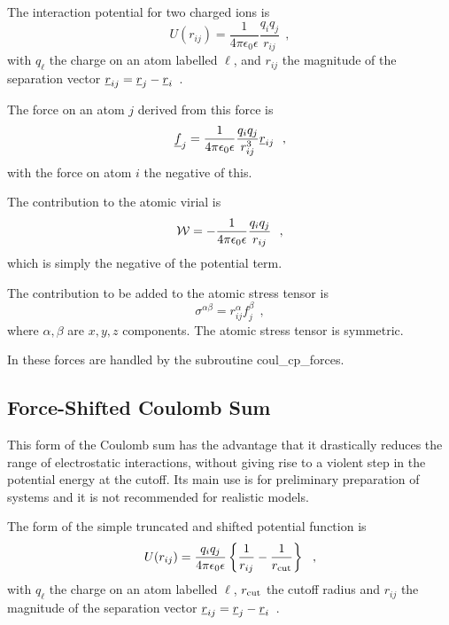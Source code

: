 The interaction potential for two charged ions is
\begin{equation}
U(r_{ij}) = \frac{1}{4\pi\epsilon_{0}\epsilon}\frac{q_{i}q_{j}}{r_{ij}}~~,
\end{equation}
with $q_{\ell}$ the charge on an atom labelled $\ell$, and
$r_{ij}$ the magnitude of the separation vector
$\mbox{$\underline{r}$}_{ij}=\mbox{$\underline{r}$}_{j}-\mbox{$\underline{r}$}_{i}$~.

The force on an atom $j$ derived from this force is
\begin{equation}
\mbox{$\underline{f}$}_{j} = \frac{1}{4\pi\epsilon_{0}\epsilon} \frac{q_{i}q_{j}}{r_{ij}^{3}} \mbox{$\underline{r}$}_{ij}~~,
\end{equation}
with the force on atom $i$ the negative of this.

The contribution to the atomic virial is
\begin{equation}
{\cal W} = -\frac{1}{4\pi\epsilon_{0}\epsilon} \frac{q_{i}q_{j}}{r_{ij}}~~,
\end{equation}
which is simply the negative of the potential term.

The contribution to be added to the atomic stress tensor is
\begin{equation}
\sigma^{\alpha \beta} = r_{ij}^{\alpha} f_{j}^{\beta}~~,
\end{equation}
where $\alpha,\beta$ are $x,y,z$ components.  The atomic
stress tensor is symmetric.

In \D these forces are handled by the subroutine {\sc
coul\_cp\_forces}.

\subsection{Force-Shifted Coulomb Sum}

This form of the Coulomb sum has the advantage that it drastically
reduces the range of electrostatic interactions, without giving
rise to a violent step in the potential energy at the cutoff.  Its
main use is for preliminary preparation of systems and it is not
recommended for realistic models.

The form of the simple truncated and shifted potential function is
\begin{equation}
U(r_{ij}) = \frac{q_{i}q_{j}}{4\pi\epsilon_{0}\epsilon}
\left\{\frac{1}{r_{ij}} - \frac{1}{r_{\rm cut}}\right\}~~,
\end{equation}
with $q_{\ell}$ the charge on an atom labelled $\ell$, $r_{\rm cut}$
the cutoff radius and $r_{ij}$ the magnitude of the separation
vector $\mbox{$\underline{r}$}_{ij}=\mbox{$\underline{r}$}_{j}-\mbox{$\underline{r}$}_{i}$~.

